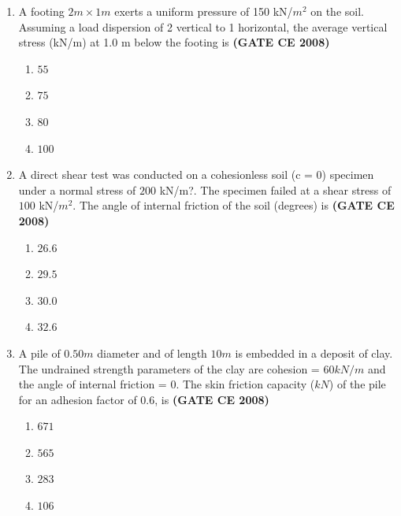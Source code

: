\documentclass[journal]{IEEEtran}
\begin{document}
\begin{enumerate}
\item A footing $2 m \times 1 m$ exerts a uniform pressure of 150 kN/$m^{2}$ on the soil. Assuming a load
dispersion of 2 vertical to 1 horizontal, the average vertical stress (kN/m) at 1.0 m below the
footing is \textbf{(GATE CE 2008)}

\begin{multicols}{2}

\begin{enumerate}
\item $55$
\item $75$
\item $80$
\item $100$
\end{enumerate}     
\end{multicols}

\item A direct shear test was conducted on a cohesionless soil (c = 0) specimen under a normal stress of $200$ kN/m?. The specimen failed at a shear stress of $100$ kN/$m^{2}$. The angle of internal friction of the soil (degrees) is \textbf{(GATE CE 2008)}

\begin{multicols}{2}

\begin{enumerate}
\item $26.6$
\item $29.5$
\item $30.0$
\item $32.6$
\end{enumerate}     
\end{multicols}

\item A pile of $0.50 m$ diameter and of length $10 m$ is embedded in a deposit of clay. The undrained strength parameters of the clay are cohesion = $60 kN/m$ and the angle of internal friction = $0$. The skin friction capacity ($kN$) of the pile for an adhesion factor of $0.6$, is \textbf{(GATE CE 2008)}

\begin{multicols}{2}

\begin{enumerate}
\item $671$
\item $565$
\item $283$
\item $106$
\end{enumerate}     
\end{multicols}


\end{enumerate}
\end{document}
